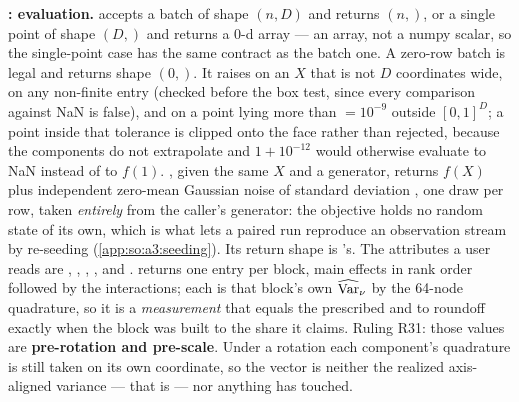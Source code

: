 \textbf{: evaluation.} 
accepts a batch of shape $(n,D)$ and returns $(n,)$, or a single point of shape
$(D,)$ and returns a 0-d array --- an array, not a numpy scalar, so the
single-point case has the same contract as the batch one. A zero-row batch is
legal and returns shape $(0,)$. It raises  on an $X$ that is
not $D$ coordinates wide, on any non-finite entry (checked before the box test,
since every comparison against NaN is false), and on a point lying more than
 $=10^{-9}$ outside ${[0,1]}^D$; a point inside that tolerance
is clipped onto the face rather than rejected, because the components do not
extrapolate and $1+10^{-12}$ would otherwise evaluate to NaN instead of to
$f(1)$. , given the same $X$ and a generator, returns $f(X)$
plus independent zero-mean
Gaussian noise of standard deviation , one draw per row,
taken \emph{entirely} from the caller's generator: the objective holds no
random state of its own, which is what lets a paired run reproduce an
observation stream by re-seeding (\ref{app:so:a3:seeding}). Its return shape is
's. The attributes a user reads are ,
, , ,  and
.  returns one entry per block,
main effects in rank order followed by the interactions; each is that block's
own $\operatorname{\widehat{\mathrm{Var}}}_\nu$ by the 64-node quadrature, so it is a \emph{measurement} that
equals the prescribed  and  to
roundoff exactly when the block was built to the share it claims. Ruling R31:
those values are \textbf{pre-rotation and pre-scale}. Under a rotation each
component's quadrature is still taken on its own coordinate, so the vector is
neither the realized axis-aligned variance --- that is 
--- nor anything  has touched.

